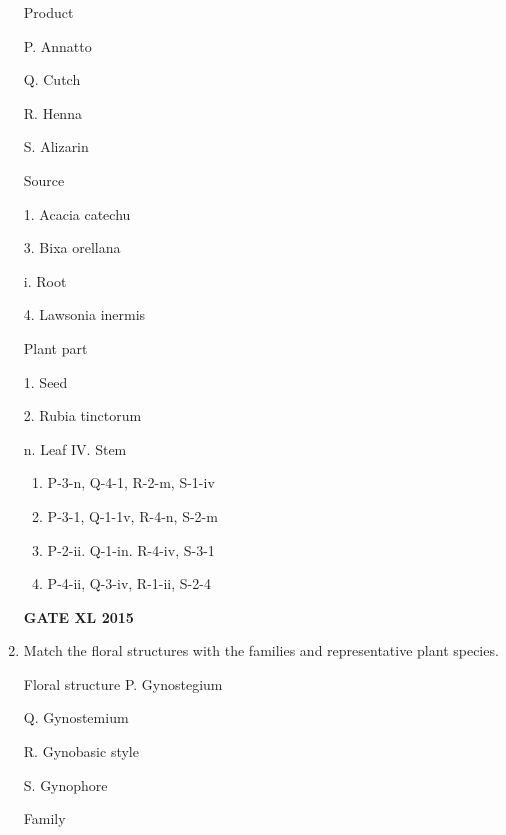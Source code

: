 \documentclass[journal,12pt,onecolumn]{IEEEtran}
\begin{document}
\begin{enumerate}
\begin{minipage}{0.3\textwidth}
	\begin{flushleft}
Product

P. Annatto

Q. Cutch

R. Henna

S. Alizarin

	\end{flushleft}
\end{minipage}
\begin{minipage}{0.3\textwidth}
	\begin{flushleft}
Source

1. Acacia catechu

3. Bixa orellana

i. Root

4. Lawsonia inermis

	\end{flushleft}
\end{minipage}
\begin{minipage}{0.3\textwidth}
	\begin{flushleft}
Plant part

1. Seed

2. Rubia tinctorum

n. Leaf
IV. Stem
	\end{flushleft}
\end{minipage} 
    \begin{enumerate}
            \item P-3-n, Q-4-1, R-2-m, S-1-iv
	    \item  P-3-1, Q-1-1v, R-4-n, S-2-m
	    \item P-2-ii. Q-1-in. R-4-iv, S-3-1
            \item P-4-ii, Q-3-iv, R-1-ii, S-2-4
    \end{enumerate}
\begin{flushright}\textbf{GATE XL 2015}\end{flushright}
\item Match the floral structures with the families and representative plant species.

\begin{minipage}{0.3\textwidth}
	\begin{flushleft}
Floral structure
P. Gynostegium

Q. Gynostemium

R. Gynobasic style

S. Gynophore

	\end{flushleft}
\end{minipage}
\begin{minipage}{0.3\textwidth}
	\begin{flushleft}
Family



\end{flushleft}
\end{minipage}
\end{enumerate}
\end{document}
